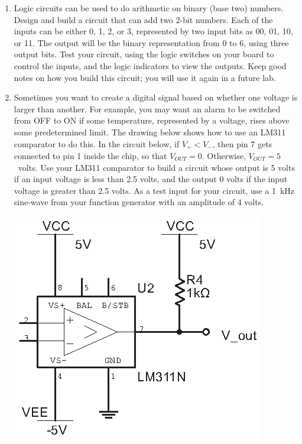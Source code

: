 \begin{enumerate}[wide]
\item Logic circuits can be used to do arithmetic on binary (base two) numbers.  Design and build a circuit that can add two 2-bit numbers.  Each of the inputs can be either 0, 1, 2, or 3, represented by two input bits as 00, 01, 10, or 11.  The output will be the binary representation from 0 to 6, using three output bits.  Test your circuit, using the logic switches on your board to control the inputs, and the logic indicators to view the outputs.  Keep good notes on how you build this circuit; you will use it again in a future lab.


\item Sometimes you want to create a digital signal based on whether one voltage is larger than another.  For example, you may want an alarm to be switched from OFF to ON if some temperature, represented by a voltage, rises above some predetermined limit. The drawing below shows how to use an LM311 comparator to do this.  In the circuit below, if $V_+<V_-$, then pin 7 gets connected to pin 1 inside the chip, so that $V_{OUT}=0$.  Otherwise, $V_{OUT}=5$~volts.  Use your LM311 comparator to build a circuit whose output is 5 volts if an input voltage is less than 2.5 volts, and the output 0 volts if the input voltage is greater than 2.5 volts.  As a test input for your circuit, use a 1~kHz sine-wave from your function generator with an amplitude of 4 volts.

\begin{center}
\includegraphics{digital_electronics/basic_lm311.eps}
\end{center}


\end{enumerate}

